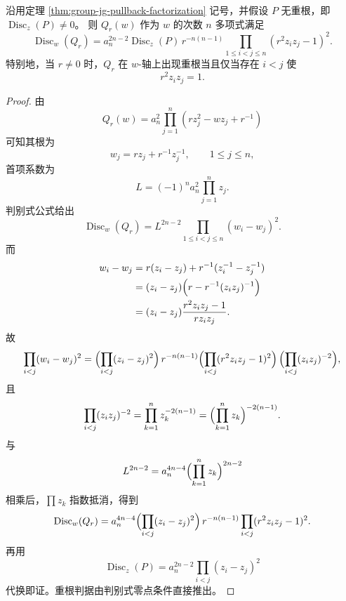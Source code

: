 \begin{theorem}[输运结式判别式的完全分解与碰撞谱]\label{thm:group-jg-discriminant-factorization}
沿用定理 \ref{thm:group-jg-pullback-factorization} 记号，并假设 \(P\) 无重根，即 \(\operatorname{Disc}_{z}(P)\neq 0\)。
则 \(Q_r(w)\) 作为 \(w\) 的次数 \(n\) 多项式满足
\[
\boxed{\;
\operatorname{Disc}_{w}(Q_r)
=a_n^{2n-2}\operatorname{Disc}_{z}(P)\,
r^{-n(n-1)}
\prod_{1\le i<j\le n}(r^2 z_i z_j-1)^2.
\;}
\]
特别地，当 \(r\neq 0\) 时，\(Q_r\) 在 \(w\)-轴上出现重根当且仅当存在 \(i<j\) 使
\[
r^2 z_i z_j=1.
\]
\end{theorem}
\begin{proof}
由
\[
Q_r(w)=a_n^2\prod_{j=1}^{n}(r z_j^2-w z_j+r^{-1})
\]
可知其根为
\[
w_j=r z_j+r^{-1}z_j^{-1},\qquad 1\le j\le n,
\]
首项系数为
\[
L=(-1)^n a_n^2\prod_{j=1}^{n} z_j.
\]
判别式公式给出
\[
\operatorname{Disc}_{w}(Q_r)=L^{2n-2}\prod_{1\le i<j\le n}(w_i-w_j)^2.
\]
而
\[
\begin{aligned}
w_i-w_j
&=r(z_i-z_j)+r^{-1}(z_i^{-1}-z_j^{-1})\\
&=(z_i-z_j)\Bigl(r-r^{-1}(z_i z_j)^{-1}\Bigr)\\
&=(z_i-z_j)\frac{r^2 z_i z_j-1}{r z_i z_j}.
\end{aligned}
\]
故
\[
\prod_{i<j}(w_i-w_j)^2
=\Bigl(\prod_{i<j}(z_i-z_j)^2\Bigr)\,
r^{-n(n-1)}
\Bigl(\prod_{i<j}(r^2 z_i z_j-1)^2\Bigr)\,
\Bigl(\prod_{i<j}(z_i z_j)^{-2}\Bigr),
\]
且
\[
\prod_{i<j}(z_i z_j)^{-2}
=\prod_{k=1}^{n} z_k^{-2(n-1)}
=\Bigl(\prod_{k=1}^{n} z_k\Bigr)^{-2(n-1)}.
\]
与
\[
L^{2n-2}=a_n^{4n-4}\Bigl(\prod_{k=1}^{n} z_k\Bigr)^{2n-2}
\]
相乘后，\(\prod z_k\) 指数抵消，得到
\[
\operatorname{Disc}_{w}(Q_r)
=a_n^{4n-4}\Bigl(\prod_{i<j}(z_i-z_j)^2\Bigr)\,
r^{-n(n-1)}
\prod_{i<j}(r^2 z_i z_j-1)^2.
\]
再用
\[
\operatorname{Disc}_{z}(P)=a_n^{2n-2}\prod_{i<j}(z_i-z_j)^2
\]
代换即证。重根判据由判别式零点条件直接推出。
\end{proof}



